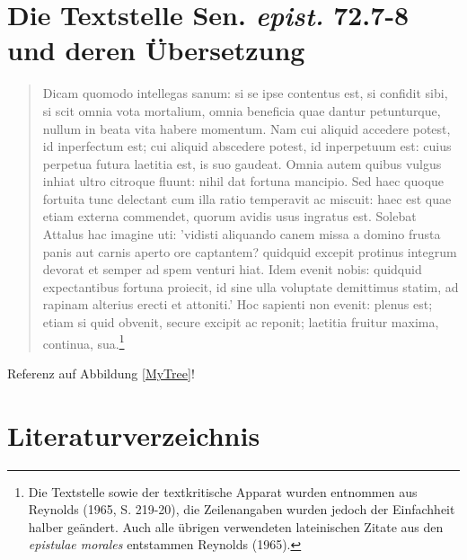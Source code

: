 \documentclass[12pt,a4paper]{article}
\begin{document}
\section{Die Textstelle Sen. \textit{epist.} 72.7-8 und deren Übersetzung}
\renewcommand\linenumberfont{\normalfont\small}
\begin{linenumbers}
\begin{quotation}
\selectfont
Dicam quomodo intellegas sanum: si se ipse contentus est, si confidit sibi, si scit omnia vota mortalium, omnia beneficia quae dantur petunturque, nullum in beata vita habere momentum. Nam cui aliquid accedere potest, id inperfectum est; cui aliquid abscedere potest, id inperpetuum est: cuius perpetua futura laetitia est, is suo gaudeat. Omnia autem quibus vulgus inhiat ultro citroque fluunt: nihil dat fortuna mancipio. Sed haec quoque fortuita tunc delectant cum illa ratio temperavit ac miscuit: haec est quae etiam externa commendet, quorum avidis usus ingratus est. Solebat Attalus hac imagine uti: 'vidisti aliquando canem missa a domino frusta panis aut carnis aperto ore captantem? quidquid excepit protinus integrum devorat et semper ad spem venturi hiat. Idem evenit nobis: quid\-quid expectantibus fortuna proiecit, id sine ulla voluptate demittimus statim, ad rapinam alterius erecti et attoniti.' Hoc sapienti non evenit: plenus est; etiam si quid obvenit, secure excipit ac reponit; laetitia fruitur maxima, continua, sua.\footnote{Die Textstelle sowie der textkritische Apparat wurden entnommen aus Reynolds (1965, S. 219-20), die Zeilenangaben wurden jedoch der Einfachheit halber geändert. Auch alle übrigen verwendeten lateinischen Zitate aus den \textit{epistulae morales} entstammen Reynolds (1965).}
\end{quotation}
\end{linenumbers}
\vspace{0.5cm}
\selectfont

Referenz auf Abbildung \ref{MyTree}!
%
\pagebreak
\section*{Literaturverzeichnis}
\bibbycategory
{}
\end{document}
